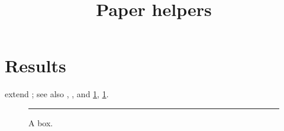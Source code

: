 \documentclass[bib=paper.bib, bibstyle=authoryear, backref=false]{akizumi-note}
\title{Paper helpers}
\begin{document}
\maketitle
\section{Results}\label{sec:res}
\citet{lin2026} extend \citet{sutton2018}; see also \citep{lin2026,sutton2018},
\citeauthor{sutton2018}, and \cref{sec:res}, \cref{fig:y}.
 
\begin{figure}[h]\centering\rule{2cm}{1cm}\caption{A box.}\label{fig:y}\end{figure}
\printbibliography
\end{document}
